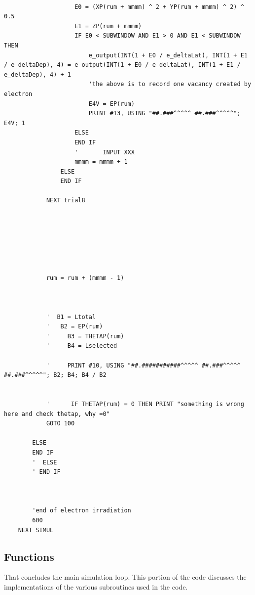 \documentclass[10pt, reqno]{exam}
\begin{document}
\begin{verbatim}

                    E0 = (XP(rum + mmmm) ^ 2 + YP(rum + mmmm) ^ 2) ^ 0.5
                    E1 = ZP(rum + mmmm)
                    IF E0 < SUBWINDOW AND E1 > 0 AND E1 < SUBWINDOW THEN
                        e_output(INT(1 + E0 / e_deltaLat), INT(1 + E1 / e_deltaDep), 4) = e_output(INT(1 + E0 / e_deltaLat), INT(1 + E1 / e_deltaDep), 4) + 1
                        'the above is to record one vacancy created by electron
                        E4V = EP(rum)
                        PRINT #13, USING "##.###^^^^^ ##.###^^^^^"; E4V; 1
                    ELSE
                    END IF
                    '       INPUT XXX
                    mmmm = mmmm + 1
                ELSE
                END IF
    
            NEXT trial8
    
    
    
    
    
    
    
            rum = rum + (mmmm - 1)
    
    
    
            '  B1 = Ltotal
            '   B2 = EP(rum)
            '     B3 = THETAP(rum)
            '     B4 = Lselected
    
            '     PRINT #10, USING "##.###########^^^^^ ##.###^^^^^ ##.###^^^^^"; B2; B4; B4 / B2
    
    
            '      IF THETAP(rum) = 0 THEN PRINT "something is wrong here and check thetap, why =0"
            GOTO 100
    
        ELSE
        END IF
        '  ELSE
        ' END IF
    
    
    
        'end of electron irradiation
        600
    NEXT SIMUL
\end{verbatim}

\subsection{Functions}

That concludes the main simulation loop. This portion of the code discusses the implementations of the various subroutines used in the code.
\end{document}
